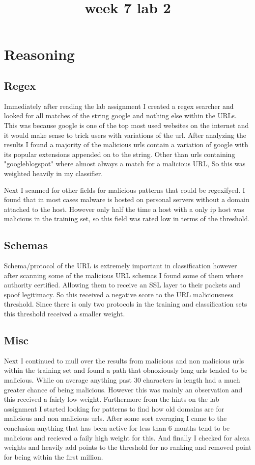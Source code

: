 \documentclass[letterpaper,12pt,titlepage,onecolumn]{IEEEtran}
\author{\name}
\title{week 7 lab 2}
\begin{document}
\maketitle
\hrulefill


\section{Reasoning}
\subsection{Regex}
Immediately after reading the lab assignment I created a regex searcher and looked for all matches of the string google and nothing else within the URLs. This was because google is one of the top most used websites on the internet and it would make sense to trick users with variations of the url. After analyzing the results I found a majority of the malicious urls contain a variation of google with its popular extensions appended on to the string. Other than urls containing "googleblogspot" where almost always a match for a malicious URL, So this was weighted heavily in my classifier.\par
Next I scanned for other fields for malicious patterns that could be regexifyed. I found that in most cases malware is hosted on personal servers without a domain attached to the host. However only half the time a host with a only ip host was malicious in the training set, so this field was rated low in terms of the threshold.

\subsection{Schemas}
Schema/protocol of the URL is extremely important in classification however after scanning some of the malicious URL schemas I found some of them where authority certified. Allowing them to receive an SSL layer to their packets and spoof legitimacy. So this received a negative score to the URL maliciousness threshold. Since there is only two protocols in the training and classification sets this threshold received a smaller weight.



\subsection{Misc}
Next I continued to mull over the results from malicious and non malicious urls within the training set and found a path that obnoxiously long urls tended to be malicious. While on average anything past 30 characters in length had a much greater chance of being malicious. However this was mainly an observation and this received a fairly low weight. Furthermore  from the hints on the lab assignment I started looking for patterns to find how old domains are for malicious and non malicious urls. After some sort averaging I came to the conclusion anything that has been active for less than 6 months tend to be malicious and recieved a faily high weight for this. And finally I checked for alexa weights and heavily add points to the threshold for no ranking and removed point for being within the first million. 
\end{document}
